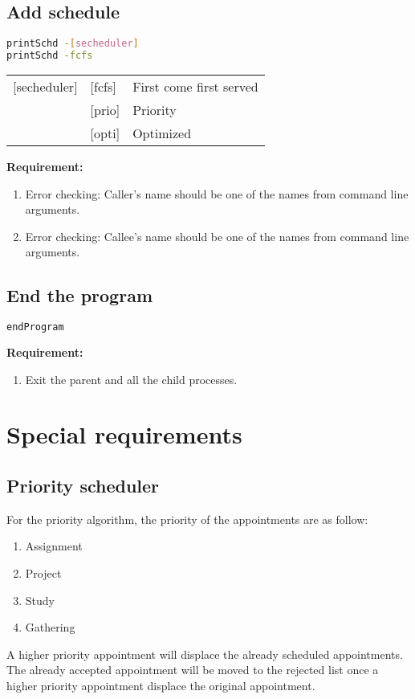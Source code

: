 \documentclass[12pt,a4paper]{report}
\begin{document}
\subsection{Add schedule}
\begin{lstlisting}[language=bash,basicstyle=\ttfamily,keywordstyle=\bfseries]
printSchd -[secheduler]
printSchd -fcfs
\end{lstlisting}

\begin{table}[h]
\begin{tabular}{lll}
{[}secheduler{]} & {[}fcfs{]} & First come first served \\
 & {[}prio{]} & Priority \\
 & {[}opti{]} & Optimized
\end{tabular}
\end{table}

\textbf{Requirement:}
\begin{enumerate}
\item Error checking: Caller's name should be one of the names from command line arguments.
\item Error checking: Callee's name should be one of the names from command line arguments.
\end{enumerate}

\subsection{End the program}
\begin{lstlisting}[language=bash,basicstyle=\ttfamily,keywordstyle=\bfseries]
endProgram
\end{lstlisting}

\textbf{Requirement:}
\begin{enumerate}
\item Exit the parent and all the child processes.
\end{enumerate}

\section{Special requirements}
\subsection{Priority scheduler}
For the priority algorithm, the priority of the appointments are as follow:
\label{Requirement:Priority}
\begin{enumerate}
\item Assignment
\item Project
\item Study
\item Gathering
\end{enumerate}
A higher priority appointment will displace the already scheduled appointments. The already accepted appointment will be moved to the rejected list once a higher priority appointment displace the original appointment.
\end{document}
